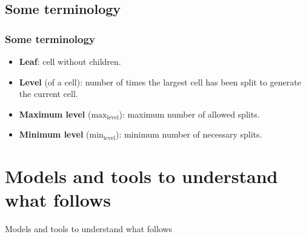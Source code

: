 \documentclass[8pt]{beamer}
\begin{document}
\subsection{Some terminology}
\begin{frame}
 \frametitle{Some terminology}
 \pause
 \begin{itemize}
 \item \textbf{Leaf}: cell without children.\pause
  \item \textbf{Level} (of a cell): number of times the largest cell has been split to generate the current cell.\pause
  \item \textbf{Maximum level} ($\text{max}_{\text{level}}$): maximum number of allowed splits.
  \item \textbf{Minimum level} ($\text{min}_{\text{level}}$): minimum number of necessary splits.
 \end{itemize}

\end{frame}

\section{Models and tools to understand what follows}
\begin{frame}
 \begin{center}
  \begin{huge}
   Models and tools to understand what follows
  \end{huge}
 \end{center}
\end{frame}
\end{document}
